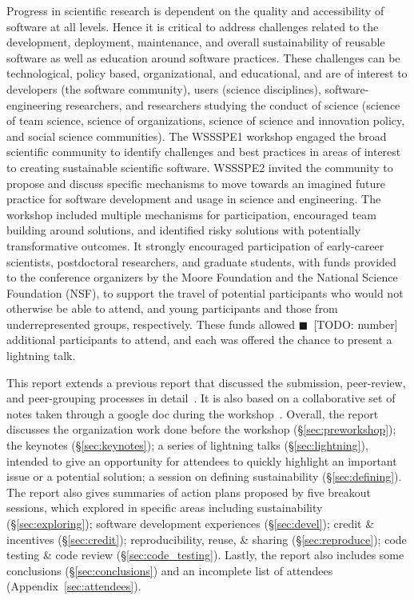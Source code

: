 \documentclass[11pt, oneside]{amsart}
\newcommand{\todo}[1]{{\color{blue}$\blacksquare$~\textsf{[TODO: #1]}}}
\begin{document}
Progress in scientific research is dependent on the quality and accessibility of
software at all levels. Hence it is critical to address challenges related to
the development, deployment, maintenance, and overall sustainability of reusable
software as well as education around software practices. These challenges can be
technological, policy based, organizational, and educational, and are of
interest to developers (the software community), users (science disciplines),
software-engineering researchers, and researchers studying the conduct of
science (science of team science, science of organizations, science of science
and innovation policy, and social science communities). The WSSSPE1 workshop
engaged the broad scientific community to identify challenges and best practices
in areas of interest to creating sustainable scientific software. WSSSPE2
invited the community to propose and discuss specific mechanisms to move towards
an imagined future practice for software development and usage in science and
engineering. The workshop included multiple mechanisms for participation,
encouraged team building around solutions, and identified risky solutions with
potentially transformative outcomes. It strongly encouraged participation of
early-career scientists, postdoctoral researchers, and graduate students, with
funds provided to the conference organizers by the Moore Foundation and the
National Science Foundation (NSF), to support the travel of potential participants who
would not otherwise be able to attend, and young participants and those from
underrepresented groups, respectively.  These funds allowed \todo{number}
additional participants to attend, and each was offered the chance to present a
lightning talk.

This report extends a previous report that discussed the submission,
peer-review, and peer-grouping processes in detail~\cite{WSSSPE2-pre-report}.
It is also based on a collaborative set of notes taken through a google doc
during the workshop~\cite{WSSSPE2-google-notes}. Overall, the report discusses
the organization work done before the workshop (\S\ref{sec:preworkshop}); the
keynotes (\S\ref{sec:keynotes}); a series of lightning talks
(\S\ref{sec:lightning}), intended to give an opportunity for attendees to
quickly highlight an important issue or a potential solution; a session on
defining sustainability (\S\ref{sec:defining}). The report also gives summaries
of action plans proposed by five breakout sessions, which explored in specific
areas including sustainability (\S\ref{sec:exploring}); software development
experiences (\S\ref{sec:devel}); credit \& incentives (\S\ref{sec:credit});
reproducibility, reuse, \& sharing (\S\ref{sec:reproduce}); code testing \& code
review (\S\ref{sec:code_testing}). Lastly, the report also includes some
conclusions (\S\ref{sec:conclusions}) and an incomplete list of attendees
(Appendix~\ref{sec:attendees}).
\end{document}

